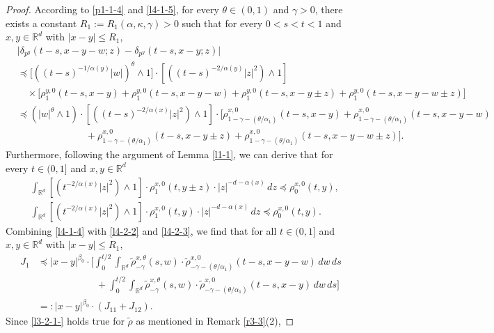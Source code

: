 \documentclass[a4paper,11pt]{amsart}
\renewcommand{\le}{\leqslant}
\newcommand{\R}{\mathds R}
\newcommand{\B}{\beta}
\newcommand{\T}{\theta}
\newcommand{\p}{\preceq}
\newcommand{\K}{\kappa}
\newcommand{\A}{\alpha}
\newcommand{\G}{\gamma}
\theoremstyle{definition}
\begin{document}
\begin{proof}
According to \eqref{p1-1-4} and \eqref{l4-1-5}, for every $\T \in (0,1)$ and $\G>0$, there exists a constant
$R_1:=R_1(\A,\K,\G)>0$ such that for every $0<s<t<1$ and $x,y\in \R^d$ with $|x-y|\le R_1$,
\begin{equation}\label{l4-2-2}
\begin{split}
&\big|\delta_{p^y}(t-s,x-y-w;z)-\delta_{p^y}(t-s,x-y;z)\big|\\
&\p \big[\left((t-s)^{-{1/\A(y)}}|w|\right)^{\T}\wedge 1\big]\cdot
\left[\left((t-s)^{-{2}/{\A(y)}}|z|^2\right)\wedge 1\right]
\\
&\quad\times\big[
\rho_1^{y,0}(t-s,x-y)+\rho_1^{y,0}(t-s,x-y-w)
+\rho_1^{y,0}(t-s,x-y\pm z)+\rho_1^{y,0}(t-s,x-y-w\pm z)\big]\\
&\p \left(|w|^{\T}\wedge 1\right)\cdot
\left[\left((t-s)^{-{2}/{\A(x)}}|z|^2\right)\wedge 1\right]
 \cdot\big[
\rho_{1-\G-({\T}/{\A_1})}^{x,0}(t-s,x-y)+\rho_{1-\G-({\T}/{\A_1})}^{x,0}(t-s,x-y-w)\\
&\qquad\qquad\qquad\quad
+\rho_{1-\G-({\T}/{\A_1})}^{x,0}(t-s,x-y\pm z)+\rho_{1-\G-({\T}/{\A_1})}^{x,0}(t-s,x-y-w\pm z)\big].
\end{split}
\end{equation}
Furthermore, following the argument of Lemma \ref{l1-1}, we can derive that for every $t\in (0,1]$ and $x,y \in \R^d$
\begin{equation}\label{l4-2-3}
\begin{split}
&\int_{\R^d} \left[\left(t^{-{2}/{\A(x)}}|z|^2\right)\wedge 1\right]
\cdot \rho_{1}^{x,0}(t,y \pm z)\cdot |z|^{-d-\A(x)}\,dz
\p \rho^{x,0}_{0}(t,y),\\
&\int_{\R^d} \left[\left(t^{-{2}/{\A(x)}}|z|^2\right)\wedge 1\right]
\cdot \rho_{1}^{x,0}(t,y)\cdot |z|^{-d-\A(x)}\,dz
\p \rho^{x,0}_{0}(t,y).
\end{split}
\end{equation}
Combining \eqref{l4-1-4} with \eqref{l4-2-2} and \eqref{l4-2-3}, we find that for  all $t\in(0,1]$ and  $x,y\in\R^d$ with $|x-y|\le R_1$,
\begin{align*}
J_1 &\p |x-y|^{\B_0}\cdot \bigg[
\int_0^{{t}/{2}}\int_{\R^d}\tilde \rho^{x,\T}_{-\G}(s,w)\cdot
\tilde \rho^{x,0}_{-\G-({\T}/{\A_1})}(t-s,x-y-w)\,dw\,ds\\
&\qquad\qquad\qquad+\int_0^{{t}/{2}}\int_{\R^d}\tilde \rho^{x,\T}_{-\G}(s,w)\cdot
\tilde \rho^{x,0}_{-\G-({\T}/{\A_1})}(t-s,x-y)\,dw\,ds\bigg]\\
&=:|x-y|^{\B_0}\cdot(J_{11}+J_{12}).
\end{align*}
Since \eqref{l3-2-1-} holds true for $\tilde \rho$ as mentioned in Remark \ref{r3-3}(2),

\end{proof}
\end{document}
